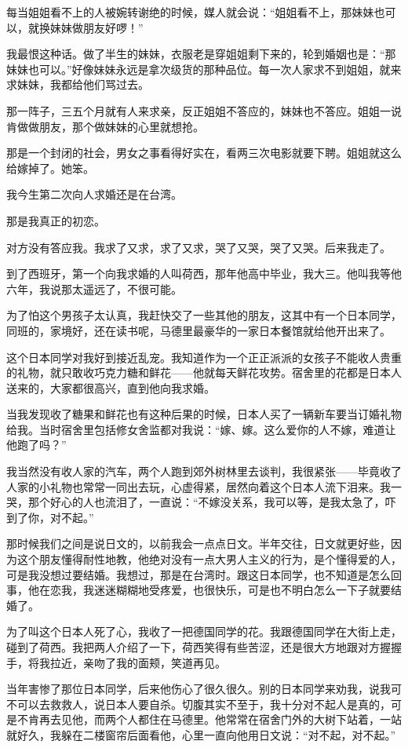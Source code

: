 \par 每当姐姐看不上的人被婉转谢绝的时候，媒人就会说：“姐姐看不上，那妹妹也可以，就换妹妹做朋友好啰！”
\par 我最恨这种话。做了半生的妹妹，衣服老是穿姐姐剩下来的，轮到婚姻也是：“那妹妹也可以。”好像妹妹永远是拿次级货的那种品位。每一次人家求不到姐姐，就来求妹妹，我都给他们骂过去。
\par 那一阵子，三五个月就有人来求亲，反正姐姐不答应的，妹妹也不答应。姐姐一说肯做做朋友，那个做妹妹的心里就想抢。
\par 那是一个封闭的社会，男女之事看得好实在，看两三次电影就要下聘。姐姐就这么给嫁掉了。她笨。
\par 我今生第二次向人求婚还是在台湾。
\par 那是我真正的初恋。
\par 对方没有答应我。我求了又求，求了又求，哭了又哭，哭了又哭。后来我走了。
\par 到了西班牙，第一个向我求婚的人叫荷西，那年他高中毕业，我大三。他叫我等他六年，我说那太遥远了，不很可能。
\par 为了怕这个男孩子太认真，我赶快交了一些其他的朋友，这其中有一个日本同学，同班的，家境好，还在读书呢，马德里最豪华的一家日本餐馆就给他开出来了。
\par 这个日本同学对我好到接近乱宠。我知道作为一个正正派派的女孩子不能收人贵重的礼物，就只敢收巧克力糖和鲜花——他就每天鲜花攻势。宿舍里的花都是日本人送来的，大家都很高兴，直到他向我求婚。
\par 当我发现收了糖果和鲜花也有这种后果的时候，日本人买了一辆新车要当订婚礼物给我。当时宿舍里包括修女舍监都对我说：“嫁、嫁。这么爱你的人不嫁，难道让他跑了吗？”
\par 我当然没有收人家的汽车，两个人跑到郊外树林里去谈判，我很紧张——毕竟收了人家的小礼物也常常一同出去玩，心虚得紧，居然向着这个日本人流下泪来。我一哭，那个好心的人也流泪了，一直说：“不嫁没关系，我可以等，是我太急了，吓到了你，对不起。”
\par 那时候我们之间是说日文的，以前我会一点点日文。半年交往，日文就更好些，因为这个朋友懂得耐性地教，他绝对没有一点大男人主义的行为，是个懂得爱的人，可是我没想过要结婚。我想过，那是在台湾时。跟这日本同学，也不知道是怎么回事，他在恋我，我迷迷糊糊地受疼爱，也很快乐，可是也不明白怎么一下子就要结婚了。
\par 为了叫这个日本人死了心，我收了一把德国同学的花。我跟德国同学在大街上走，碰到了荷西。我把两人介绍了一下，荷西笑得有些苦涩，还是很大方地跟对方握握手，将我拉近，亲吻了我的面颊，笑道再见。
\par 当年害惨了那位日本同学，后来他伤心了很久很久。别的日本同学来劝我，说我可不可以去救救人，说日本人要自杀。切腹其实不至于，我十分对不起人是真的，可是不肯再去见他，而两个人都住在马德里。他常常在宿舍门外的大树下站着，一站就好久，我躲在二楼窗帘后面看他，心里一直向他用日文说：“对不起，对不起。”
